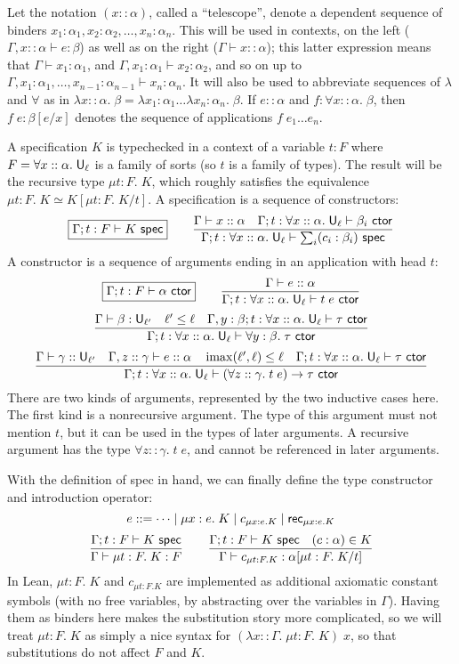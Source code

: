 Let the notation $(x :: \alpha)$, called a ``telescope'', denote a dependent sequence of binders $x_1:\alpha_1, x_2:\alpha_2,\dots, x_n:\alpha_n$. This will be used in contexts, on the left ($\Gamma,x::\alpha\vdash e:\beta$) as well as on the right ($\Gamma\vdash x::\alpha$); this latter expression means that $\Gamma\vdash x_1:\alpha_1$, and $\Gamma,x_1:\alpha_1\vdash x_2:\alpha_2$, and so on up to\\
$\Gamma,x_1:\alpha_1,\dots,x_{n-1}:\alpha_{n-1}\vdash x_n:\alpha_n$. It will also be used to abbreviate sequences of $\lambda$ and $\forall$ as in $\lambda x::\alpha.\;\beta=\lambda x_1:\alpha_1\dots\lambda x_n:\alpha_n.\;\beta$. If $e::\alpha$ and $f:\forall x::\alpha.\;\beta$, then $f\;e:\beta[e/x]$ denotes the sequence of applications $f\;e_1\dots e_n$.

A specification $K$ is typechecked in a context of a variable $t:F$ where $F=\forall x::\alpha.\;\mathsf{U}_\ell$ is a family of sorts (so $t$ is a family of types). The result will be the recursive type $\mu t:F.\;K$, which roughly satisfies the equivalence $\mu t:F.\;K\simeq K[\mu t:F.\;K/t]$. A specification is a sequence of constructors:
$$\boxed{\Gamma;t:F\vdash K\spec} \qquad
\frac{\Gamma\vdash x::\alpha\quad \Gamma;t:\forall x::\alpha.\;\U_\ell\vdash \beta_i\ctor}{\Gamma;t:\forall x::\alpha.\;\U_\ell\vdash \sum_i(c_i:\beta_i)\spec}$$
A constructor is a sequence of arguments ending in an application with head $t$:
$$\boxed{\Gamma;t:F\vdash \alpha\ctor} \qquad
\frac{\Gamma\vdash e::\alpha}{\Gamma;t:\forall x::\alpha.\;\U_\ell\vdash t\;e\ctor}$$
$$\frac{\Gamma\vdash \beta:\U_{\ell'}\quad \ell'\le\ell\quad \Gamma,y:\beta;t:\forall x::\alpha.\;\U_\ell\vdash\tau\ctor}{\Gamma;t:\forall x::\alpha.\;\U_\ell\vdash\forall y:\beta.\;\tau\ctor}$$
$$\frac{\Gamma\vdash \gamma::\U_{\ell'}\quad \Gamma,z::\gamma\vdash e::\alpha \quad
\imax(\ell',\ell)\le\ell\quad \Gamma;t:\forall x::\alpha.\;\U_\ell\vdash\tau\ctor}{\Gamma;t:\forall x::\alpha.\;\U_\ell\vdash(\forall z::\gamma.\;t\;e)\to\tau\ctor}$$
There are two kinds of arguments, represented by the two inductive cases here. The first kind is a nonrecursive argument. The type of this argument must not mention $t$, but it can be used in the types of later arguments. A recursive argument has the type $\forall z::\gamma.\;t\;e$, and cannot be referenced in later arguments.

With the definition of \textsf{spec} in hand, we can finally define the type constructor and introduction operator:
%
$$e::=\dots\mid\mu x:e.\;K\mid c_{\mu x:e.K}\mid\mathsf{rec}_{\mu x:e.K}$$
$$\frac{\Gamma;t:F\vdash K\spec}{\Gamma\vdash \mu t:F.\;K:F}\qquad
\frac{\Gamma;t:F\vdash K\spec\quad (c:\alpha)\in K}{\Gamma\vdash c_{\mu t:F.K}:\alpha[\mu t:F.\;K/t]}$$
In Lean, $\mu t:F.\;K$ and $c_{\mu t:F.K}$ are implemented as additional axiomatic constant symbols (with no free variables, by abstracting over the variables in $\Gamma$). Having them as binders here makes the substitution story more complicated, so we will treat $\mu t:F.\;K$ as simply a nice syntax for $(\lambda x::\Gamma.\;\mu t:F.\;K)\;x$, so that substitutions do not affect $F$ and $K$.

